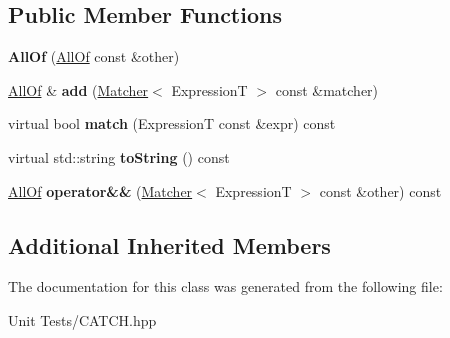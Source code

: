 \subsection*{Public Member Functions}
\begin{DoxyCompactItemize}
\item 
{\bfseries All\+Of} (\hyperlink{classCatch_1_1Matchers_1_1Impl_1_1Generic_1_1AllOf}{All\+Of} const \&other)\hypertarget{classCatch_1_1Matchers_1_1Impl_1_1Generic_1_1AllOf_a31f7c5e570e79bdf64064ee87c331a59}{}\label{classCatch_1_1Matchers_1_1Impl_1_1Generic_1_1AllOf_a31f7c5e570e79bdf64064ee87c331a59}

\item 
\hyperlink{classCatch_1_1Matchers_1_1Impl_1_1Generic_1_1AllOf}{All\+Of} \& {\bfseries add} (\hyperlink{structCatch_1_1Matchers_1_1Impl_1_1Matcher}{Matcher}$<$ ExpressionT $>$ const \&matcher)\hypertarget{classCatch_1_1Matchers_1_1Impl_1_1Generic_1_1AllOf_a8c5cd1e494ab697076da418ee72ac297}{}\label{classCatch_1_1Matchers_1_1Impl_1_1Generic_1_1AllOf_a8c5cd1e494ab697076da418ee72ac297}

\item 
virtual bool {\bfseries match} (ExpressionT const \&expr) const \hypertarget{classCatch_1_1Matchers_1_1Impl_1_1Generic_1_1AllOf_a04534d0ac9e089f4500c3c19054f11ce}{}\label{classCatch_1_1Matchers_1_1Impl_1_1Generic_1_1AllOf_a04534d0ac9e089f4500c3c19054f11ce}

\item 
virtual std\+::string {\bfseries to\+String} () const \hypertarget{classCatch_1_1Matchers_1_1Impl_1_1Generic_1_1AllOf_a9febc1e67acbeff62a32bcbfdc0c8fab}{}\label{classCatch_1_1Matchers_1_1Impl_1_1Generic_1_1AllOf_a9febc1e67acbeff62a32bcbfdc0c8fab}

\item 
\hyperlink{classCatch_1_1Matchers_1_1Impl_1_1Generic_1_1AllOf}{All\+Of} {\bfseries operator\&\&} (\hyperlink{structCatch_1_1Matchers_1_1Impl_1_1Matcher}{Matcher}$<$ ExpressionT $>$ const \&other) const \hypertarget{classCatch_1_1Matchers_1_1Impl_1_1Generic_1_1AllOf_ac2b4045ae39746852a0f603715ba1387}{}\label{classCatch_1_1Matchers_1_1Impl_1_1Generic_1_1AllOf_ac2b4045ae39746852a0f603715ba1387}

\end{DoxyCompactItemize}
\subsection*{Additional Inherited Members}


The documentation for this class was generated from the following file\+:\begin{DoxyCompactItemize}
\item 
Unit Tests/C\+A\+T\+C\+H.\+hpp\end{DoxyCompactItemize}
